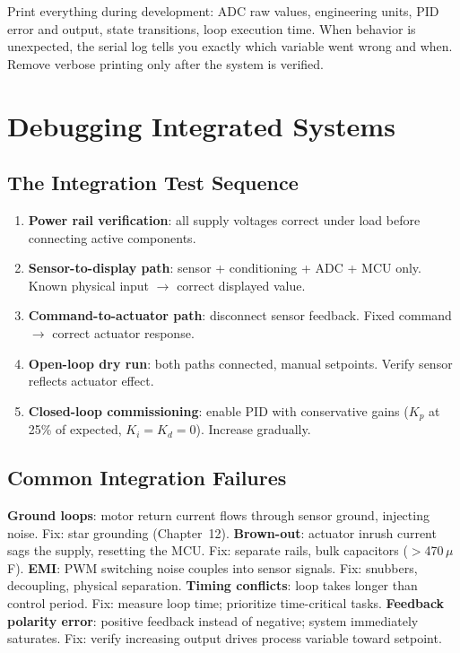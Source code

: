 \documentclass[11pt,letterpaper,twoside,openany]{book}
\begin{document}
\begin{tipbox}[Serial Monitor = Oscilloscope for Code]
Print everything during development: ADC raw values, engineering units, PID error and output, state transitions, loop execution time. When behavior is unexpected, the serial log tells you exactly which variable went wrong and when. Remove verbose printing only after the system is verified.
\end{tipbox}

\section{Debugging Integrated Systems}

\subsection{The Integration Test Sequence}
\begin{enumerate}[leftmargin=1.5em]
\item \textbf{Power rail verification}: all supply voltages correct under load before connecting active components.
\item \textbf{Sensor-to-display path}: sensor + conditioning + ADC + MCU only. Known physical input $\to$ correct displayed value.
\item \textbf{Command-to-actuator path}: disconnect sensor feedback. Fixed command $\to$ correct actuator response.
\item \textbf{Open-loop dry run}: both paths connected, manual setpoints. Verify sensor reflects actuator effect.
\item \textbf{Closed-loop commissioning}: enable PID with conservative gains ($K_p$ at 25\% of expected, $K_i = K_d = 0$). Increase gradually.
\end{enumerate}

\subsection{Common Integration Failures}
\textbf{Ground loops}: motor return current flows through sensor ground, injecting noise. Fix: star grounding (Chapter~12). \textbf{Brown-out}: actuator inrush current sags the supply, resetting the MCU. Fix: separate rails, bulk capacitors ($>$470\,$\mu$F). \textbf{EMI}: PWM switching noise couples into sensor signals. Fix: snubbers, decoupling, physical separation. \textbf{Timing conflicts}: loop takes longer than control period. Fix: measure loop time; prioritize time-critical tasks. \textbf{Feedback polarity error}: positive feedback instead of negative; system immediately saturates. Fix: verify increasing output drives process variable toward setpoint.
\end{document}
